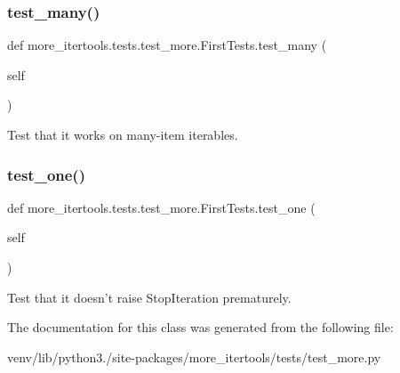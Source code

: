 \subsubsection{\texorpdfstring{test\+\_\+many()}{test\_many()}}
{\footnotesize\ttfamily def more\+\_\+itertools.\+tests.\+test\+\_\+more.\+First\+Tests.\+test\+\_\+many (\begin{DoxyParamCaption}\item[{}]{self }\end{DoxyParamCaption})}

\begin{DoxyVerb}Test that it works on many-item iterables.\end{DoxyVerb}
 \mbox{\label{classmore__itertools_1_1tests_1_1test__more_1_1_first_tests_aa4435615e65ede6a083f73d98ba750f4}} 
\subsubsection{\texorpdfstring{test\+\_\+one()}{test\_one()}}
{\footnotesize\ttfamily def more\+\_\+itertools.\+tests.\+test\+\_\+more.\+First\+Tests.\+test\+\_\+one (\begin{DoxyParamCaption}\item[{}]{self }\end{DoxyParamCaption})}

\begin{DoxyVerb}Test that it doesn't raise StopIteration prematurely.\end{DoxyVerb}
 

The documentation for this class was generated from the following file\+:\begin{DoxyCompactItemize}
\item 
venv/lib/python3./site-\/packages/more\+\_\+itertools/tests/test\+\_\+more.\+py\end{DoxyCompactItemize}
